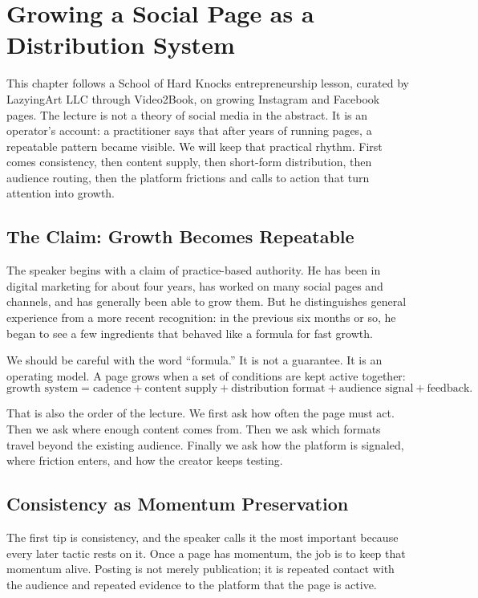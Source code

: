 \chapter{Growing a Social Page as a Distribution System}

This chapter follows a School of Hard Knocks entrepreneurship lesson, curated by LazyingArt LLC through Video2Book, on growing Instagram and Facebook pages. The lecture is not a theory of social media in the abstract. It is an operator's account: a practitioner says that after years of running pages, a repeatable pattern became visible. We will keep that practical rhythm. First comes consistency, then content supply, then short-form distribution, then audience routing, then the platform frictions and calls to action that turn attention into growth.

\section{The Claim: Growth Becomes Repeatable}

The speaker begins with a claim of practice-based authority. He has been in digital marketing for about four years, has worked on many social pages and channels, and has generally been able to grow them. But he distinguishes general experience from a more recent recognition: in the previous six months or so, he began to see a few ingredients that behaved like a formula for fast growth.

We should be careful with the word ``formula.'' It is not a guarantee. It is an operating model. A page grows when a set of conditions are kept active together:
\begin{equation}
\text{growth system}
=
\text{cadence}
+
\text{content supply}
+
\text{distribution format}
+
\text{audience signal}
+
\text{feedback}.
\end{equation}

That is also the order of the lecture. We first ask how often the page must act. Then we ask where enough content comes from. Then we ask which formats travel beyond the existing audience. Finally we ask how the platform is signaled, where friction enters, and how the creator keeps testing.

\section{Consistency as Momentum Preservation}

The first tip is consistency, and the speaker calls it the most important because every later tactic rests on it. Once a page has momentum, the job is to keep that momentum alive. Posting is not merely publication; it is repeated contact with the audience and repeated evidence to the platform that the page is active.

